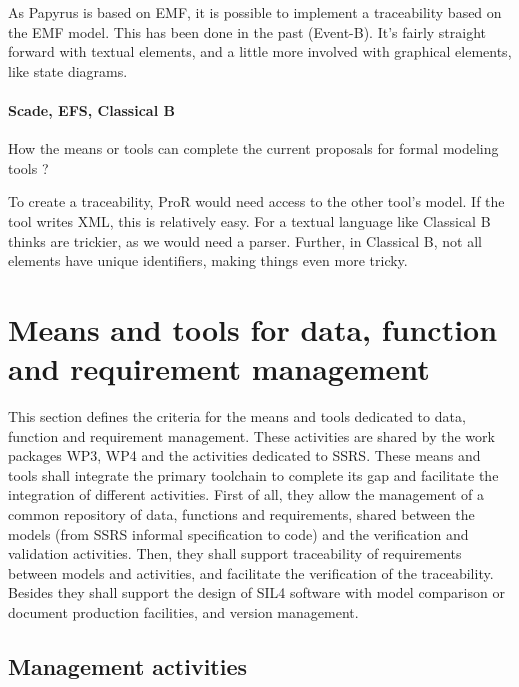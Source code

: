 \begin{author_comment}
As Papyrus is based on EMF, it is possible to implement a traceability based on the EMF model.  This has been done in the past (Event-B).  It's fairly straight forward with textual elements, and a little more involved with graphical elements, like state diagrams.

\end{author_comment}

\paragraph{Scade, EFS, Classical B}
How the means or tools can complete the current proposals for formal modeling tools ?

\begin{author_comment}
To create a traceability, ProR would need access to the other tool's model.  If the tool writes XML, this is relatively easy.  For a textual language like Classical B thinks are trickier, as we would need a parser.  Further, in Classical B, not all elements have unique identifiers, making things even more tricky.
\end{author_comment}


\section{Means and tools for data, function and requirement management}
\label{sec:management}


This section defines the criteria for the means and tools dedicated to data, function and requirement management. These activities are shared by the work packages WP3, WP4 and the activities dedicated to  SSRS.
These means and tools shall integrate the primary toolchain to  complete its gap and facilitate the integration of different activities. First of all, they  allow the management of a common repository of data, functions and requirements, shared between the models (from SSRS informal specification to code) and the verification and validation activities.
Then, they shall support traceability of requirements between models and activities, and facilitate the verification of the traceability.
Besides they shall support the design of SIL4 software with model comparison or document production facilities, and version management.

\subsection{Management activities}

